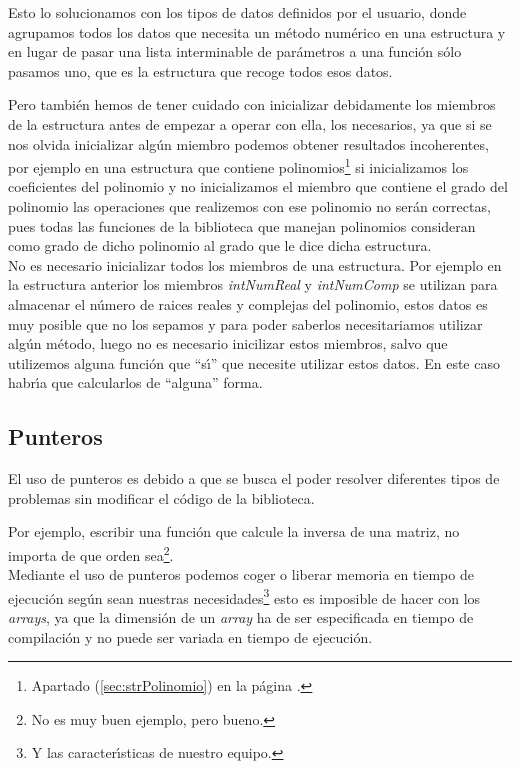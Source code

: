 Esto lo solucionamos con los tipos de datos definidos por el usuario, donde
agrupamos todos los datos que necesita un m\'etodo num\'erico en una estructura
y en lugar de pasar una lista interminable de par\'ametros a una funci\'on 
s\'olo pasamos uno, que es la estructura que recoge todos esos datos.\newline

Pero tambi\'en hemos de tener cuidado con inicializar debidamente los miembros
de la estructura antes de empezar a operar con ella, los necesarios,
ya que si se nos olvida inicializar alg\'un miembro podemos obtener resultados
incoherentes, por ejemplo en una estructura que contiene polinomios\footnote{%
Apartado (\ref{sec:strPolinomio}) en la p\'agina \pageref{sec:strPolinomio}.}
si inicializamos los coeficientes del polinomio y no inicializamos el miembro
que contiene el grado del polinomio las operaciones que realizemos con ese
polinomio no ser\'an correctas, pues todas las funciones de la biblioteca que
manejan polinomios consideran como grado de dicho polinomio al grado que le
dice dicha estructura.\\

No es necesario inicializar todos los miembros de una estructura. Por ejemplo
en la estructura anterior los miembros \emph{intNumReal} y \emph{intNumComp}
se utilizan para almacenar el n\'umero de raices reales y complejas del 
polinomio, estos datos es muy posible que no los sepamos y para poder saberlos
necesitariamos utilizar alg\'un m\'etodo, luego no es necesario inicilizar
estos miembros, salvo que utilizemos alguna funci\'on que ``s\'{\i}'' que 
necesite utilizar estos datos. En este caso habr\'{\i}a que calcularlos de
``alguna'' forma.

\subsection{Punteros}

El uso de punteros es debido a que se busca el poder resolver diferentes
tipos de problemas sin modificar el c\'odigo de la biblioteca.\newline

Por ejemplo, escribir una funci\'on que calcule la inversa de una matriz,
no importa de que orden sea\footnote{No es muy buen ejemplo, pero bueno.}.\\

Mediante el uso de punteros podemos coger o liberar memoria en tiempo de 
ejecuci\'on seg\'un sean nuestras necesidades\footnote{Y las
caracter\'{\i}sticas de nuestro equipo.} esto es imposible de hacer con los
\emph{arrays}, ya que la dimensi\'on de un \emph{array} ha de ser especificada
en tiempo de compilaci\'on y no puede ser variada en tiempo de ejecuci\'on.\\

